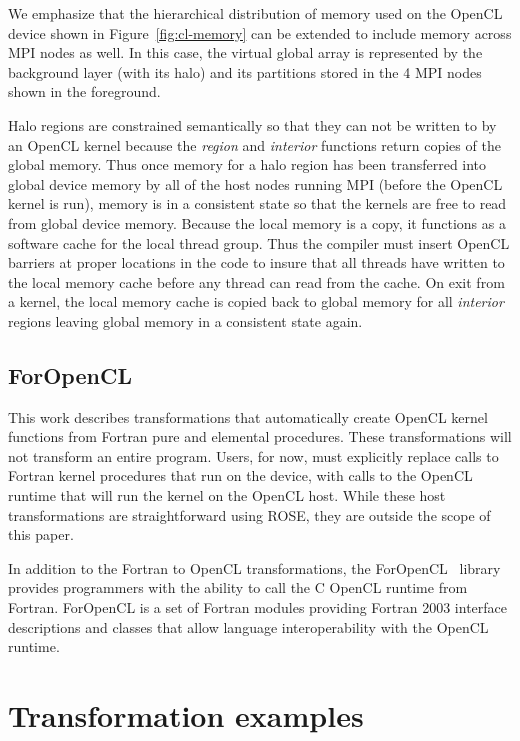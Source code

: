 We emphasize that the hierarchical distribution of memory used on the
OpenCL device shown in Figure~\ref{fig:cl-memory} can be extended to include memory
across MPI nodes as well.  In this case, the virtual global array is represented by the background
layer (with its halo) and its partitions stored in the 4 MPI nodes shown in the
foreground.

Halo regions are constrained semantically so that they can not be written to
by an OpenCL kernel because the \emph{region} and \emph{interior} functions
return copies of the global memory.  Thus once memory for a halo region has
been transferred into global device memory by all of the host nodes running
MPI (before the OpenCL kernel is run), memory is in a consistent state so that
the kernels are free to read from global device memory.  Because the local
memory is a copy, it functions as a software cache for the local thread group.
Thus the compiler must insert OpenCL barriers at proper locations in the code
to insure that all threads have written to the local memory cache before any
thread can read from the cache.  On exit from a kernel, the local memory cache
is copied back to global memory for all \emph{interior} regions leaving global
memory in a consistent state again.

\subsection{ForOpenCL}

This work describes transformations that automatically create OpenCL kernel
functions from Fortran pure and elemental procedures.  These transformations
will not transform an entire program.  Users, for now, must explicitly replace
calls to Fortran kernel procedures that run on the device, with calls to the
OpenCL runtime that will run the kernel on the OpenCL host.  While these host
transformations are straightforward using ROSE, they are outside the scope of
this paper.

In addition to the Fortran to OpenCL transformations, the
ForOpenCL~\cite{http:ofp} library provides programmers with the ability to
call the C OpenCL runtime from Fortran.  ForOpenCL is a set of Fortran modules
providing Fortran 2003 interface descriptions and classes that allow language
interoperability with the OpenCL runtime.


\section{Transformation examples}

